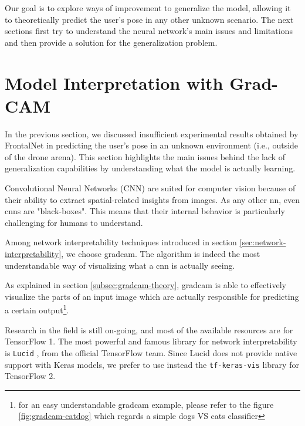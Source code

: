 \medskip

Our goal is to explore ways of improvement to generalize the model, allowing it to theoretically predict the user's pose in any other unknown scenario. The next sections first try to understand the neural network's main issues and limitations and then provide a solution for the generalization problem.




\section{Model Interpretation with Grad-CAM}
\label{sec:model-interpretration}


In the previous section, we discussed insufficient experimental results obtained by FrontalNet in predicting the user's pose in an unknown environment (i.e., outside of the drone arena). This section highlights the main issues behind the lack of generalization capabilities by understanding what the model is actually learning.

\medskip

Convolutional Neural Networks (CNN) are suited for computer vision because of their ability to extract spatial-related insights from images. As any other \gls{nn}, even \gls{cnn}s are "black-boxes". This means that their internal behavior is particularly challenging for humans to understand.

Among network interpretability techniques introduced in section \ref{sec:network-interpretability}, we choose \gls{gradcam}. The algorithm is indeed the most understandable way of visualizing what a \gls{cnn} is actually seeing.

As explained in section \ref{subsec:gradcam-theory}, \gls{gradcam} is able to effectively visualize the parts of an input image which are actually responsible for predicting a certain output\footnote{for an easy understandable \gls{gradcam} example, please refer to the figure \ref{fig:gradcam-catdog} which regards a simple dogs VS cats classifier}.

\medskip

Research in the field is still on-going, and most of the available resources are for TensorFlow 1. The most powerful and famous library for network interpretability is \texttt{Lucid} \cite{tf-lucid}, from the official TensorFlow team. Since Lucid does not provide native support with Keras models, we prefer to use instead the \texttt{tf-keras-vis} library \cite{tf-keras-vis} for TensorFlow 2.



